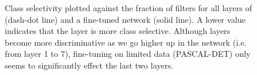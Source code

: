 \begin{figure}[t!]
\centering
{}
\caption{Class selectivity plotted against the fraction of filters for all layers of  (dash-dot line) and a fine-tuned network (solid line). A lower value indicates that the layer is more class selective. Although layers become more discriminative as we go higher up in the network (i.e. from layer 1 to 7), fine-tuning on limited data (PASCAL-DET) only seems to significantly effect the last two layers.}
\label{fig:fine-entropy}
\end{figure}

\setlength{\tabcolsep}{2pt}
\begin{table}[t!]
\begin{center}
\caption{Comparison in performance when fine-tuning the entire network (ft) versus only fine-tuning the fully-connected layers (fc-ft).}
\label{table:fine-fc-ft}
\vspace{0.3em}
\end{center}
\end{table}
\setlength{\tabcolsep}{1.4pt}


